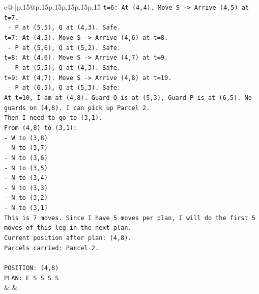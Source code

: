 \documentclass{article}
\begin{document}
{\begin{supertabular}{c@{$\;$}|p{.15\linewidth}@{}p{.15\linewidth}p{.15\linewidth}p{.15\linewidth}p{.15\linewidth}p{.15\linewidth}}
{{{\texttt{t=6: At (4,4). Move S {-}> Arrive (4,5) at t=7.} \\
\texttt{  {-} P at (5,5), Q at (4,3). Safe.} \\
\texttt{t=7: At (4,5). Move S {-}> Arrive (4,6) at t=8.} \\
\texttt{  {-} P at (5,6), Q at (5,2). Safe.} \\
\texttt{t=8: At (4,6). Move S {-}> Arrive (4,7) at t=9.} \\
\texttt{  {-} P at (5,5), Q at (4,3). Safe.} \\
\texttt{t=9: At (4,7). Move S {-}> Arrive (4,8) at t=10.} \\
\texttt{  {-} P at (6,5), Q at (5,3). Safe.} \\
\texttt{At t=10, I am at (4,8). Guard Q is at (5,3), Guard P is at (6,5). No guards on (4,8). I can pick up Parcel 2.} \\
\texttt{Then I need to go to (3,1).} \\
\texttt{From (4,8) to (3,1):} \\
\texttt{{-} W to (3,8)} \\
\texttt{{-} N to (3,7)} \\
\texttt{{-} N to (3,6)} \\
\texttt{{-} N to (3,5)} \\
\texttt{{-} N to (3,4)} \\
\texttt{{-} N to (3,3)} \\
\texttt{{-} N to (3,2)} \\
\texttt{{-} N to (3,1)} \\
\texttt{This is 7 moves. Since I have 5 moves per plan, I will do the first 5 moves of this leg in the next plan.} \\
\texttt{Current position after plan: (4,8).} \\
\texttt{Parcels carried: Parcel 2.} \\
\\ 
\texttt{POSITION: (4,8)} \\
\texttt{PLAN: E S S S S} \\
            }
        }
    }
    & & \\ \\


\end{supertabular}}
\end{document}
